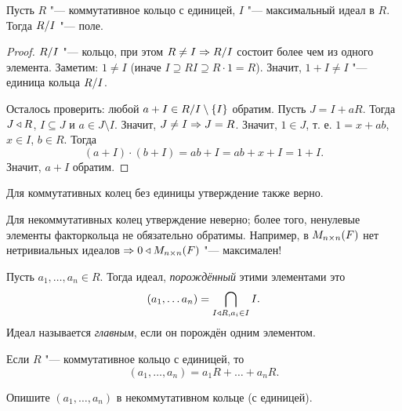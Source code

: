\documentclass[main]{subfiles}
\begin{document}
\begin{proposition}
  Пусть \( R \) "--- коммутативное кольцо с единицей,
  \( I \) "--- максимальный идеал в \( R \).
  Тогда \( \Factor{R}[I] \) "--- поле.
\end{proposition}
\begin{proof}
  \( \Factor{R}[I] \) "--- кольцо, при этом \( R \ne I \To
  \Factor{R}[I] \) состоит более чем из одного элемента.
  Заметим: \( 1 \ne I \) (иначе \( I \supseteq RI \supseteq R \cdot 1 = R \)).
  Значит, \( 1 + I \ne I \) "--- единица кольца
  \( \Factor{R}[I] \).

  Осталось проверить: любой \( a + I \in \Factor{R}[I]
  \setminus \{ I \} \) обратим.
  Пусть \( J = I + aR \). Тогда \( J \triangleleft R \),
  \( I \subseteq J \) и \( a \in J \setminus I \).
  Значит, \( J \ne I \Rightarrow J = R \).
  Значит, \( 1 \in J \), т. е. \( 1 = x + ab \),
  \( x \in I \), \( b \in R \).
  Тогда
  \[
    (a + I) \cdot (b + I) = ab + I = ab + x + I = 1 + I.
  \]
  Значит, \( a + I \) обратим.
\end{proof}

\begin{remark}
  Для коммутативных колец без единицы утверждение также верно.
\end{remark}
\begin{remark}
  Для некоммутативных колец утверждение неверно;
  более того, ненулевые элементы факторкольца
  не обязательно обратимы.
  Например, в \( \Matrices[F]{n}{n} \) нет
  нетривиальных идеалов \( \To 0 \NSG \Matrices[F]{n}{n} \) "---
  максимален!
\end{remark}

\begin{definition}
  Пусть \( a_1, \dots, a_n \in R \).
  Тогда идеал, \emph{порождённый} этими элементами
  это
  \[
    (a_1, \dots a_n) = \bigcap_{I \triangleleft R, a_i \in I} I.
  \]
  Идеал называется \emph{главным}, если он
  порождён одним элементом.
\end{definition}

\begin{remark}
  Если \( R \) "--- коммутативное кольцо с единицей,
  то
  \[
    (a_1, \dots, a_n) = a_1 R + \dots + a_n R.
  \]
\end{remark}
\begin{exercise}
  Опишите \( (a_1, \dots, a_n) \) в некоммутативном кольце
  (с единицей).
\end{exercise}
\end{document}
